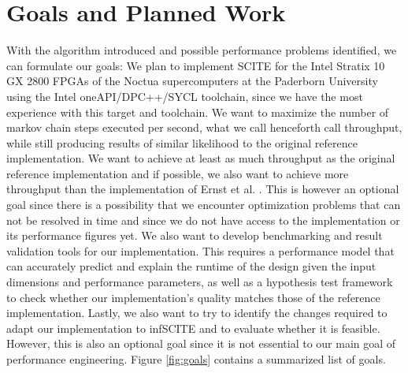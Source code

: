 \section{Goals and Planned Work}

With the algorithm introduced and possible performance problems identified, we can formulate our goals: We plan to implement \ac{SCITE} for the Intel Stratix 10 GX 2800 \acp{FPGA} of the Noctua supercomputers at the Paderborn University using the Intel oneAPI/DPC++/SYCL toolchain, since we have the most experience with this target and toolchain. We want to maximize the number of markov chain steps executed per second, what we call henceforth call throughput, while still producing results of similar likelihood to the original reference implementation. We want to achieve at least as much throughput as the original reference implementation and if possible, we also want to achieve more throughput than the implementation of Ernst et al. \cite{ernst2020Performance}. This is however an optional goal since there is a possibility that we encounter optimization problems that can not be resolved in time and since we do not have access to the implementation or its performance figures yet. We also want to develop benchmarking and result validation tools for our implementation. This requires a performance model that can accurately predict and explain the runtime of the design given the input dimensions and performance parameters, as well as a hypothesis test framework to check whether our implementation's quality matches those of the reference implementation. Lastly, we also want to try to identify the changes required to adapt our implementation to \ac{infSCITE} and to evaluate whether it is feasible. However, this is also an optional goal since it is not essential to our main goal of performance engineering. Figure \ref{fig:goals} contains a summarized list of goals.

